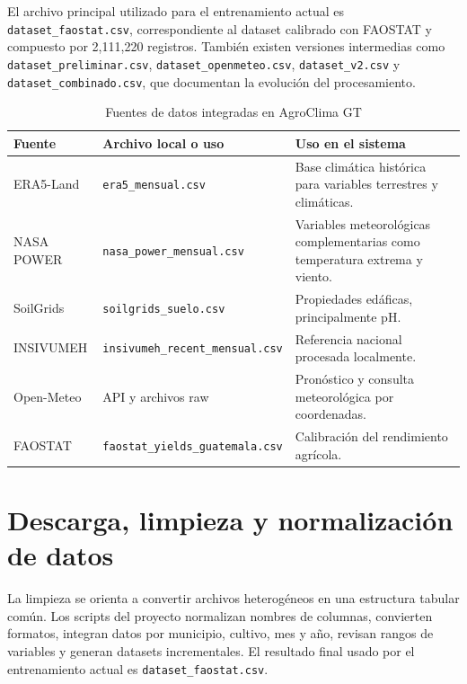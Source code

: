 \documentclass[12pt,letterpaper,oneside]{report}
\newcommand{\codigo}[1]{\texttt{#1}}
\begin{document}
El archivo principal utilizado para el entrenamiento actual es \codigo{dataset\_faostat.csv}, correspondiente al dataset calibrado con FAOSTAT y compuesto por 2,111,220 registros. También existen versiones intermedias como \codigo{dataset\_preliminar.csv}, \codigo{dataset\_openmeteo.csv}, \codigo{dataset\_v2.csv} y \codigo{dataset\_combinado.csv}, que documentan la evolución del procesamiento.

\begin{table}[H]
\centering
\caption{Fuentes de datos integradas en AgroClima GT}
\begin{tabularx}{\textwidth}{p{3cm}p{3.8cm}X}
\toprule
\textbf{Fuente} & \textbf{Archivo local o uso} & \textbf{Uso en el sistema} \\
\midrule
ERA5-Land & \codigo{era5\_mensual.csv} & Base climática histórica para variables terrestres y climáticas. \\
NASA POWER & \codigo{nasa\_power\_mensual.csv} & Variables meteorológicas complementarias como temperatura extrema y viento. \\
SoilGrids & \codigo{soilgrids\_suelo.csv} & Propiedades edáficas, principalmente pH. \\
INSIVUMEH & \codigo{insivumeh\_recent\_mensual.csv} & Referencia nacional procesada localmente. \\
Open-Meteo & API y archivos raw & Pronóstico y consulta meteorológica por coordenadas. \\
FAOSTAT & \codigo{faostat\_yields\_guatemala.csv} & Calibración del rendimiento agrícola. \\
\bottomrule
\end{tabularx}
\end{table}

\section{Descarga, limpieza y normalización de datos}
La limpieza se orienta a convertir archivos heterogéneos en una estructura tabular común. Los scripts del proyecto normalizan nombres de columnas, convierten formatos, integran datos por municipio, cultivo, mes y año, revisan rangos de variables y generan datasets incrementales. El resultado final usado por el entrenamiento actual es \codigo{dataset\_faostat.csv}.
\end{document}
